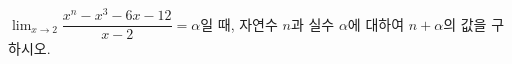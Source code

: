 $\displaystyle\lim_{x\to 2}\dfrac{x^n-x^3-6x-12}{x-2}=\alpha$일 때, 자연수 $n$과 실수 $\alpha$에 대하여 $n+\alpha$의 값을 구하시오.
